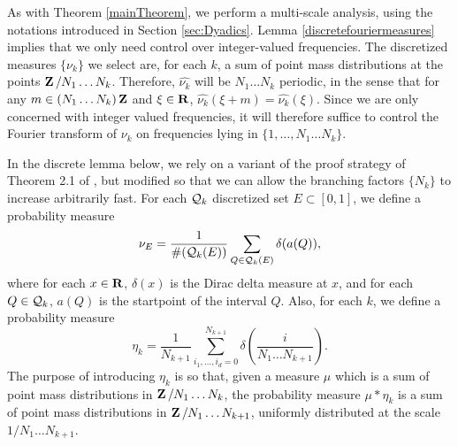 As with Theorem \ref{mainTheorem}, we perform a multi-scale analysis, using the notations introduced in Section \ref{sec:Dyadics}. Lemma \ref{discretefouriermeasures} implies that we only need control over integer-valued frequencies. The discretized measures $\{ \nu_k \}$ we select are, for each $k$, a sum of point mass distributions at the points $\operatorname{\mathbf{Z}}/N_1 \dots N_k$. Therefore, $\widehat{\nu_k}$ will be $N_1 \dots N_k$ periodic, in the sense that for any $m \in (N_1 \dots N_k) \operatorname{\mathbf{Z}}$ and $\xi \in \operatorname{\mathbf{R}}$, $\widehat{\nu_k}(\xi + m) = \widehat{\nu_k}(\xi)$. Since we are only concerned with integer valued frequencies, it will therefore suffice to control the Fourier transform of $\nu_k$ on frequencies lying in $\{ 1, \dots, N_1 \dots N_k \}$.

In the discrete lemma below, we rely on a variant of the proof strategy of Theorem 2.1 of \cite{Shmerkin}, but modified so that we can allow the branching factors $\{ N_k \}$ to increase arbitrarily fast. For each $\operatorname{\mathcal{Q}}_k$ discretized set $E \subset [0,1]$, we define a probability measure
%
\[ \nu_E = \frac{1}{\#(\operatorname{\mathcal{Q}}_k(E))} \sum_{Q \in \operatorname{\mathcal{Q}}_k(E)} \delta(a(Q)), \]
%
where for each $x \in \operatorname{\mathbf{R}}$, $\delta(x)$ is the Dirac delta measure at $x$, and for each $Q \in \operatorname{\mathcal{Q}}_k$, $a(Q)$ is the startpoint of the interval $Q$. Also, for each $k$, we define a probability measure
%
\[ \eta_k = \frac{1}{N_{k+1}} \sum_{i_1, \dots, i_d = 0}^{N_{k+1}} \delta \left( \frac{i}{N_1 \dots N_{k+1}} \right).  \]
%
The purpose of introducing $\eta_k$ is so that, given a measure $\mu$ which is a sum of point mass distributions in $\operatorname{\mathbf{Z}}/N_1 \dots N_k$, the probability measure $\mu * \eta_k$ is a sum of point mass distributions in $\operatorname{\mathbf{Z}}/N_1 \dots N_{k+1}$, uniformly distributed at the scale $1/N_1 \dots N_{k+1}$.


